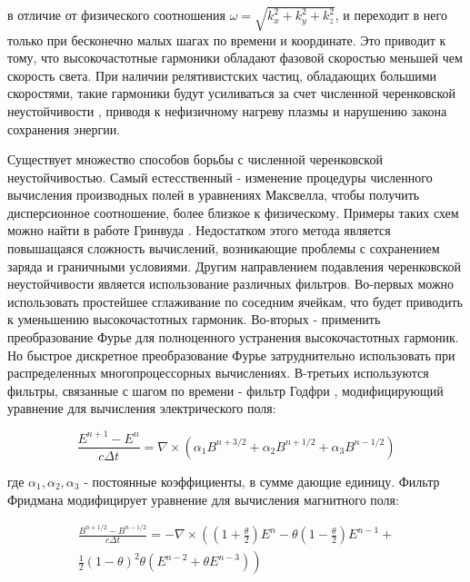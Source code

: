 в отличие от физического соотношения $\omega=\sqrt{k_x^2 + k_y^2 + k_z^2}$, и переходит в него только при бесконечно малых шагах по времени и координате. Это приводит к тому, что высокочастотные гармоники обладают фазовой скоростью меньшей чем скорость света. При наличии релятивистских частиц, обладающих большими скоростями, такие гармоники будут усиливаться за счет численной черенковской неустойчивости \cite{Godfrey1974}, приводя к нефизичному нагреву плазмы и нарушению закона сохранения энергии.

Существует множество способов борьбы с численной черенковской неустойчивостью. Самый естесственный - изменение процедуры численного вычисления производных полей в уравнениях Максвелла, чтобы получить дисперсионное соотношение, более близкое к физическому. Примеры таких схем можно найти в работе Гринвуда \cite{Greenwood2004}. Недостатком этого метода является повышащаяся сложность вычислений, возникающие проблемы с сохранением заряда и граничными условиями. Другим направлением подавления черенковской неустойчивости является использование различных фильтров. Во-первых можно использовать простейшее сглаживание по соседним ячейкам, что будет приводить к уменьшению высокочастотных гармоник. Во-вторых - применить преобразование Фурье для полноценного устранения высокочастотных гармоник. Но быстрое дискретное преобразование Фурье затруднительно использовать при распределенных многопроцессорных вычислениях. В-третьих используются фильтры, связанные с шагом по времени - фильтр Годфри \cite{Godfrey1980}, модифицирующий уравнение для вычисления электрического поля:

\begin{equation}
	\frac{E^{n+1}-E^n}{c \Delta t} = \nabla \times \left(\alpha_1 B^{n+3/2}+\alpha_2 B^{n+1/2} + \alpha_3 B^{n-1/2}\right)
\end{equation}

где $\alpha_1, \alpha_2, \alpha_3$ - постоянные коэффициенты, в сумме дающие единицу. Фильтр Фридмана \cite{Friedman1990} модифицирует уравнение для вычисления магнитного поля:

\begin{equation}
	\begin{split}
	\frac{B^{n+1/2}-B^{n-1/2}}{c \Delta t} = -\nabla \times \left(\left(1+\frac{\theta}{2}\right)E^n-\theta\left(1-\frac{\theta}{2}\right)E^{n-1}+\right.\\ \left.\frac{1}{2}\left(1-\theta\right)^2 \theta\left(E^{n-2} + \theta E^{n-3}\right)\right)
	\end{split}
\end{equation}

